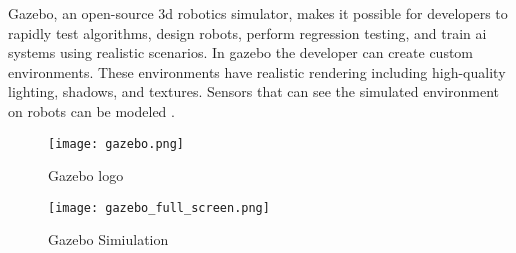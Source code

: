 
Gazebo, an open-source \acs{3d} robotics simulator, makes it possible for developers to rapidly test algorithms, design robots, 
perform regression testing, 
and train \acs{ai} systems using realistic scenarios. In gazebo the developer can create custom environments. 
These environments have realistic rendering including high-quality lighting, shadows, and textures. 
Sensors that can see the simulated environment on robots can be modeled \cite{gazebo:org}.

\begin{figure}[ht]
    \centering
    \texttt{[image: gazebo.png]}
    \caption[Gazebo logo]{Gazebo logo}
\end{figure}

\begin{figure}[ht]
    \centering
    \texttt{[image: gazebo\_full\_screen.png]}
    \caption[Gazebo Simiulation with 3 UAVs]{Gazebo Simiulation}
\end{figure}
\newpage